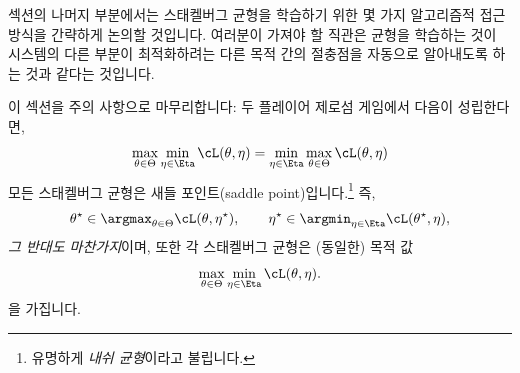 \documentclass[../../book-main_ko.tex]{subfiles}
\begin{document}
섹션의 나머지 부분에서는 스태켈버그 균형을 학습하기 위한 몇 가지 알고리즘적 접근 방식을 간략하게 논의할 것입니다. 여러분이 가져야 할 직관은 균형을 학습하는 것이 시스템의 다른 부분이 최적화하려는 다른 목적 간의 절충점을 자동으로 알아내도록 하는 것과 같다는 것입니다.

이 섹션을 주의 사항으로 마무리합니다: 두 플레이어 제로섬 게임에서 다음이 성립한다면,
\begin{equation}
    \max_{\theta \in \Theta}\min_{\eta \in \Eta}\cL(\theta, \eta) = \min_{\eta \in \Eta}\max_{\theta \in \Theta}\cL(\theta, \eta)
\end{equation}
모든 스태켈버그 균형은 새들 포인트(saddle point)입니다.\footnote{유명하게 \textit{내쉬 균형}이라고 불립니다.} 즉,
\begin{equation}
    \theta^{\star} \in \argmax_{\theta \in \Theta}\cL(\theta, \eta^{\star}), \qquad \eta^{\star} \in \argmin_{\eta \in \Eta}\cL(\theta^{\star}, \eta),
\end{equation}
\textit{그 반대도 마찬가지}이며, 또한 각 스태켈버그 균형은 (동일한) 목적 값 \[\max_{\theta \in \Theta}\min_{\eta \in \Eta}\cL(\theta, \eta).\]을 가집니다.
\end{document}
